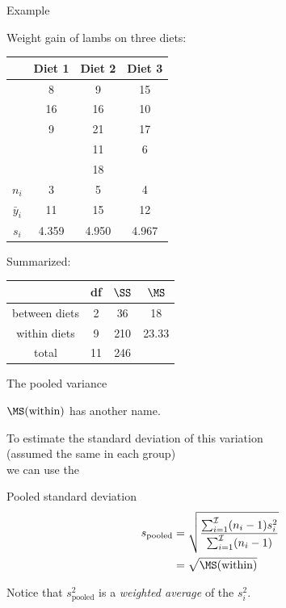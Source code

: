\begin{frame}{Example}

    Weight gain of lambs on three diets:
    \begin{center}
        \begin{tabular}{cccc}
            & Diet 1 & Diet 2 & Diet 3 \\
            \hline
            & 8 & 9 & 15 \\
            & 16 & 16 & 10 \\
            & 9 & 21 & 17 \\
            &  & 11 & 6 \\
            &  & 18 &  \\
            \hline
            $n_i$ & 3 & 5 & 4 \\
            $\bar y_i$ & 11 & 15 & 12 \\
            $s_i$ & 4.359 & 4.950 & 4.967 \\
        \end{tabular}
    \end{center}

    \vspace{2em}

    Summarized:
    \begin{center}
        \begin{tabular}{cccc}
            & df & $\SS$ & $\MS$ \\
            \hline
            between diets & 2 & 36 & 18 \\
            within diets & 9 & 210 & 23.33 \\
            \hline
            total & 11 & 246 & \\
        \end{tabular}
    \end{center}

\end{frame}

\begin{frame}{The pooled variance}

  $\MS(\text{within})$ has another name.

  \vspace{2em}

  To \alert{estimate} the standard deviation of this variation\\
  (assumed the same in each group)\\
  we can use the
  \begin{block}{Pooled standard deviation}
    \begin{align*} 
        s_\text{pooled} &= \sqrt{ \frac{ \sum_{i=1}^\mathcal{I} (n_i-1) s_i^2 }{ \sum_{i=1}^\mathcal{I} (n_i-1) } }\\
      &= \sqrt{ \MS(\text{within}) }
    \end{align*}
  \end{block}

  \vspace{2em}
  Notice that $s_\text{pooled}^2$ is a \emph{weighted average} of the $s_i^2$.

\end{frame}

